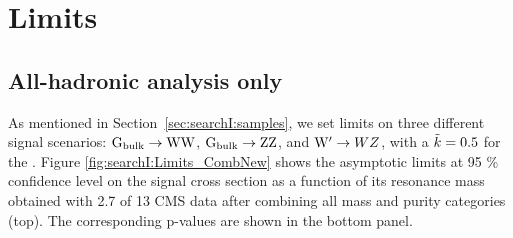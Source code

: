 \section{Limits}
\subsection{All-hadronic analysis only}
\label{sec:searchI:results4q}
As mentioned in Section~\ref{sec:searchI:samples}, we set limits on three different signal scenarios: $\mathrm{G}_\mathrm{bulk} \rightarrow \mathrm{W}\mathrm{W}$, $\mathrm{G}_\mathrm{bulk} \rightarrow \mathrm{Z}\mathrm{Z}$, and $\mathrm{W}^\prime \rightarrow WZ$, with a $\tilde{k} = 0.5$ for the \BulkG. Figure \ref{fig:searchI:Limits_CombNew} shows the asymptotic limits at 95 \% confidence level on the signal cross section as a function of its resonance mass obtained with 2.7 \fbinv of 13 \TeV CMS data after combining all mass and purity categories (top). The corresponding p-values are shown in the bottom panel.
